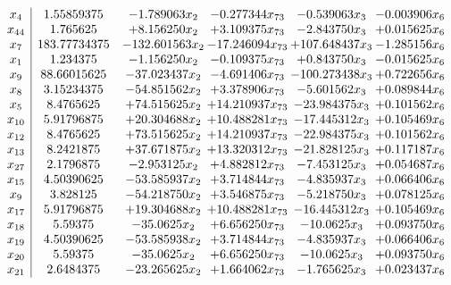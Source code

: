 \documentclass[11pt]{article}
\begin{document}
\[\begin{array}{c| c c@{\hskip 2pt} c@{\hskip 2pt} c@{\hskip 2pt} c@{\hskip 2pt} }
 x_{4}   &  1.55859375 & -1.789063 x_{2} & -0.277344 x_{73} & -0.539063 x_{3} & -0.003906 x_{6}\\
 x_{44}   &  1.765625 & + 8.156250 x_{2} & + 3.109375 x_{73} & -2.843750 x_{3} & + 0.015625 x_{6}\\
 x_{7}   &  183.77734375 & -132.601563 x_{2} & -17.246094 x_{73} & + 107.648437 x_{3} & -1.285156 x_{6}\\
 x_{1}   &  1.234375 & -1.156250 x_{2} & -0.109375 x_{73} & + 0.843750 x_{3} & -0.015625 x_{6}\\
 x_{9}   &  88.66015625 & -37.023437 x_{2} & -4.691406 x_{73} & -100.273438 x_{3} & + 0.722656 x_{6}\\
 x_{8}   &  3.15234375 & -54.851562 x_{2} & + 3.378906 x_{73} & -5.601562 x_{3} & + 0.089844 x_{6}\\
 x_{5}   &  8.4765625 & + 74.515625 x_{2} & + 14.210937 x_{73} & -23.984375 x_{3} & + 0.101562 x_{6}\\
 x_{10}   &  5.91796875 & + 20.304688 x_{2} & + 10.488281 x_{73} & -17.445312 x_{3} & + 0.105469 x_{6}\\
 x_{12}   &  8.4765625 & + 73.515625 x_{2} & + 14.210937 x_{73} & -22.984375 x_{3} & + 0.101562 x_{6}\\
 x_{13}   &  8.2421875 & + 37.671875 x_{2} & + 13.320312 x_{73} & -21.828125 x_{3} & + 0.117187 x_{6}\\
 x_{27}   &  2.1796875 & -2.953125 x_{2} & + 4.882812 x_{73} & -7.453125 x_{3} & + 0.054687 x_{6}\\
 x_{15}   &  4.50390625 & -53.585937 x_{2} & + 3.714844 x_{73} & -4.835937 x_{3} & + 0.066406 x_{6}\\
 x_{9}   &  3.828125 & -54.218750 x_{2} & + 3.546875 x_{73} & -5.218750 x_{3} & + 0.078125 x_{6}\\
 x_{17}   &  5.91796875 & + 19.304688 x_{2} & + 10.488281 x_{73} & -16.445312 x_{3} & + 0.105469 x_{6}\\
 x_{18}   &  5.59375 & -35.0625 x_{2} & + 6.656250 x_{73} & -10.0625 x_{3} & + 0.093750 x_{6}\\
 x_{19}   &  4.50390625 & -53.585938 x_{2} & + 3.714844 x_{73} & -4.835937 x_{3} & + 0.066406 x_{6}\\
 x_{20}   &  5.59375 & -35.0625 x_{2} & + 6.656250 x_{73} & -10.0625 x_{3} & + 0.093750 x_{6}\\
 x_{21}   &  2.6484375 & -23.265625 x_{2} & + 1.664062 x_{73} & -1.765625 x_{3} & + 0.023437 x_{6}\\

\end{array}\]
\end{document}
